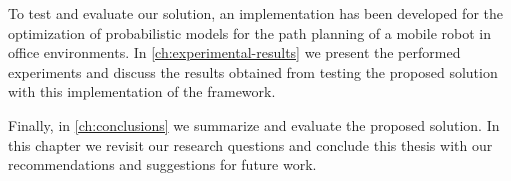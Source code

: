To test and evaluate our solution, an implementation has been developed for the optimization of probabilistic models for the path planning of a mobile robot in office environments.
In \autoref{ch:experimental-results} we present the performed experiments and discuss the results obtained from testing the proposed solution with this implementation of the framework.

Finally, in \autoref{ch:conclusions} we summarize and evaluate the proposed solution. In this chapter we revisit our research questions and conclude this thesis with our recommendations and suggestions for future work.

%
